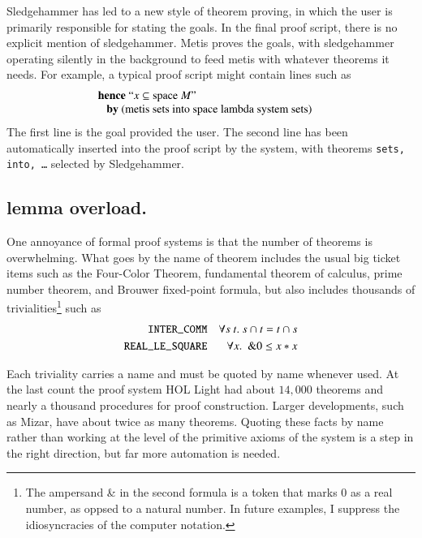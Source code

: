 \documentclass{llncs}
\begin{document}

Sledgehammer has led to a new style of theorem proving, in which the
user is primarily responsible for stating the goals.  In the final
proof script, there is no explicit mention of sledgehammer.  Metis
proves the goals, with sledgehammer operating silently in the
background to feed metis with whatever theorems it needs.
For example, a typical proof script might contain  lines such as \cite{Paar}
\[
\begin{array}{ll}
\text{{\bf hence} ``$x \subseteq \text{space}~M$''}\\
\text{~~~{\bf by} (metis sets into space lambda system sets)}&
\end{array}
\]
The first line is the goal provided the user. The second line has been
automatically inserted into the proof script by the system, with
theorems {\tt sets, into, \dots} selected by Sledgehammer.






\subsection{lemma overload.}

One annoyance of formal proof systems is that the number of theorems
is overwhelming.  What goes by the name of theorem includes
the usual big ticket items such as the Four-Color Theorem, 
fundamental theorem of calculus, prime number
theorem, and Brouwer fixed-point formula, but also includes thousands
of trivialities\footnote{The ampersand \& in the second formula is a token
that marks $0$ as a real number, as oppsed to a natural number. In future
examples, I suppress the idiosyncracies of the computer notation.} such as
\begin{align*}
\text{\tt INTER\_COMM} & &\forall s\ t.\ s \cap t = t \cap s\\
\text{\tt REAL\_LE\_SQUARE} & &\forall x.\ \ \text{\&}0 \le x * x
\end{align*}

Each triviality carries a name and must be quoted by name whenever
used.  At the last count the proof system HOL Light had about $14,000$
theorems and nearly a thousand procedures for proof construction.
Larger developments, such as Mizar, have about twice as many theorems.
Quoting these facts by name rather than working at the level of the
primitive axioms of the system is a step in the right direction, but
far more automation is needed.
\end{document}
